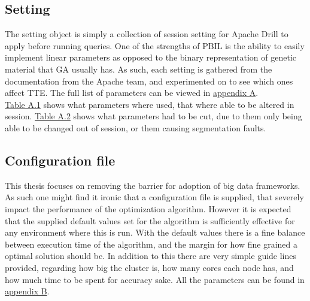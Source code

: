 \documentclass[a4paper,english]{report}
\begin{document}
		\subsection{Setting}
		The setting object is simply a collection of session setting for Apache Drill to apply before running queries. One of the strengths of PBIL is the ability to easily implement linear parameters as opposed to the binary representation of genetic material that GA usually has. As such, each setting is gathered from the documentation from the Apache team, and experimented on to see which ones affect TTE. The full list of parameters can be viewed in \hyperref[system_params]{appendix A}. \\ \hyperref[table:added_params]{Table A.1} shows what parameters where used, that where able to be altered in session. \hyperref[table:removed_params]{Table A.2} shows what parameters had to be cut, due to them only being able to be changed out of session, or them causing segmentation faults. 
		\subsection{Configuration file}
		This thesis focuses on removing the barrier for adoption of big data frameworks. As such one might find it ironic that a configuration file is supplied, that severely impact the performance of the optimization algorithm. However it is expected that the supplied default values set for the algorithm is sufficiently effective for any environment where this is run. With the default values there is a fine balance between execution time of the algorithm, and the margin for how fine grained a optimal solution should be. In addition to this there are very simple guide lines provided, regarding how big the cluster is, how many cores each node has, and how much time to be spent for accuracy sake. All the parameters can be found in \hyperref[table:conf_params]{appendix B}.
		\clearpage
\end{document}
